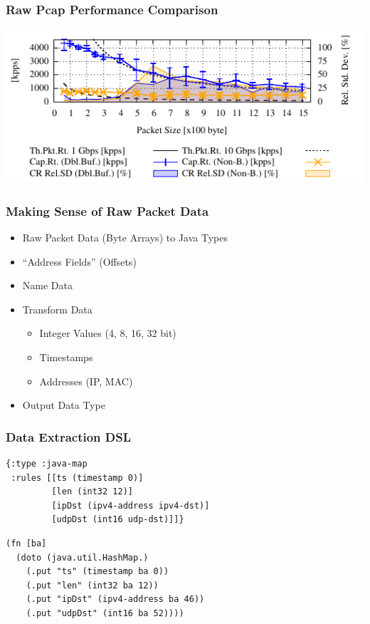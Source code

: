 \documentclass[aspectratio=169]{beamer}
\begin{document}
  \begin{frame}
      \frametitle{Raw Pcap Performance Comparison}

      \begin{center}
          \includegraphics[width=15cm]{images/comparison}
      \end{center}
  \end{frame}



  \begin{frame}
    \frametitle{Making Sense of Raw Packet Data}
    \begin{itemize}
        \item Raw Packet Data (Byte Arrays) to Java Types
        \item ``Address Fields'' (Offsets)
        \item Name Data
        \item Transform Data
            \begin{itemize}
                \item Integer Values (4, 8, 16, 32 bit)
                \item Timestamps
                \item Addresses (IP, MAC)
            \end{itemize}
        \item Output Data Type
    \end{itemize}
  \end{frame}



\begin{frame}[fragile]
\frametitle{Data Extraction DSL}
\begin{lstlisting}[caption=Extraction DSL Expression Example]
{:type :java-map
 :rules [[ts (timestamp 0)]
         [len (int32 12)]
         [ipDst (ipv4-address ipv4-dst)]
         [udpDst (int16 udp-dst)]]}
\end{lstlisting}
\begin{lstlisting}[caption=Extraction Function based on DSL]
(fn [ba]
  (doto (java.util.HashMap.)
    (.put "ts" (timestamp ba 0))
    (.put "len" (int32 ba 12))
    (.put "ipDst" (ipv4-address ba 46))
    (.put "udpDst" (int16 ba 52))))
\end{lstlisting}
\end{frame}
\end{document}
